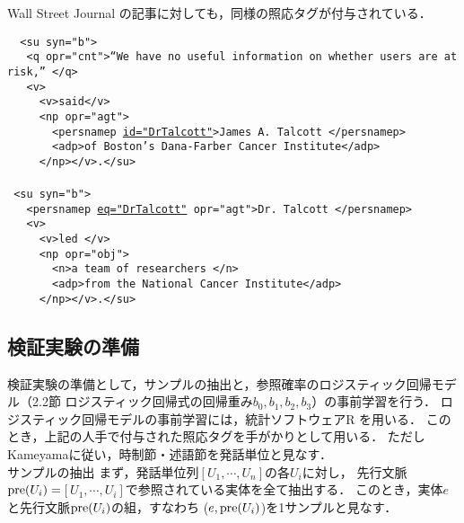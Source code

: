 \documentclass[japanese]{jnlp_1.3e}
\renewcommand{\paragraph}{}
\begin{document}
Wall Street Journal の記事に対しても，同様の照応タグが付与されている．
\vspace{\baselineskip}

{\small\tt
\noindent
~<su syn="b">\\
~~~<q opr="cnt">``We have no useful information on whether users are at risk,'' </q>\\
~~~<v>\\
~~~~~<v>said</v>\\
~~~~~<np opr="agt">\\
~~~~~~~<persnamep \underline{id="DrTalcott"}>James A. Talcott </persnamep>\\
~~~~~~~<adp>of Boston's Dana-Farber Cancer Institute</adp>\\
~~~~~</np></v>.</su>\\
\\ 
~<su syn="b">\\
~~~<persnamep \underline{eq="DrTalcott"} opr="agt">Dr. Talcott </persnamep>\\
~~~<v>\\
~~~~~<v>led </v>\\
~~~~~<np opr="obj">\\
~~~~~~~<n>a team of researchers </n>\\
~~~~~~~<adp>from the National Cancer Institute</adp>\\
~~~~~</np></v>.</su>
}
\vspace{\baselineskip}


\subsection{検証実験の準備}
検証実験の準備として，サンプルの抽出と，参照確率のロジスティック回帰モデル（2.2節 ロジスティック回帰式の回帰重み$b_0, b_1, b_2, b_3$）の事前学習を行う．
ロジスティック回帰モデルの事前学習には，統計ソフトウェアR を用いる．
このとき，上記の人手で付与された照応タグを手がかりとして用いる．
ただしKameyama\citeyear{kameyama1998}に従い，時制節・述語節を発話単位と見なす．\\


\paragraph{サンプルの抽出}
まず，発話単位列$[U_1,\cdots,U_n]$の各$U_i$に対し，
先行文脈${\rm pre}(U_i)=$\linebreak$[U_1,\cdots,U_i]$で参照されている実体を全て抽出する．
このとき，実体$e$と先行文脈${\rm pre}(U_i)$の組，すなわち
($e, {\rm pre}(U_i)$)を1サンプルと見なす．
\end{document}
